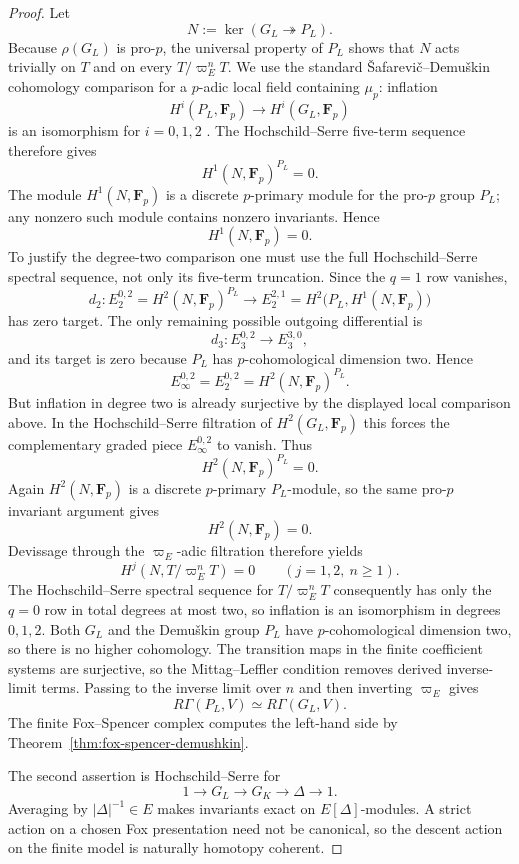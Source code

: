 \documentclass[11pt]{article}
\theoremstyle{definition}
\begin{document}
\begin{proof}
Let
\[
N:=\ker(G_L\twoheadrightarrow P_L).
\]
Because $\rho(G_L)$ is pro-$p$, the universal property of $P_L$ shows that $N$ acts trivially on $T$ and on every $T/\varpi_E^nT$.  We use the standard \v{S}afarevi\v{c}--Demu\v{s}kin cohomology comparison for a $p$-adic local field containing $\mu_p$: inflation
\[
H^i(P_L,\mathbf F_p)\longrightarrow H^i(G_L,\mathbf F_p)
\]
is an isomorphism for $i=0,1,2$ \cite{NSW}.  The Hochschild--Serre five-term sequence therefore gives
\[
H^1(N,\mathbf F_p)^{P_L}=0.
\]
The module $H^1(N,\mathbf F_p)$ is a discrete $p$-primary module for the pro-$p$ group $P_L$; any nonzero such module contains nonzero invariants.  Hence
\[
H^1(N,\mathbf F_p)=0.
\]
To justify the degree-two comparison one must use the full Hochschild--Serre spectral sequence, not only its five-term truncation.  Since the $q=1$ row vanishes,
\[
d_2:E_2^{0,2}=H^2(N,\mathbf F_p)^{P_L}
   \longrightarrow
   E_2^{2,1}=H^2\bigl(P_L,H^1(N,\mathbf F_p)\bigr)
\]
has zero target.  The only remaining possible outgoing differential is
\[
d_3:E_3^{0,2}\longrightarrow E_3^{3,0},
\]
and its target is zero because $P_L$ has $p$-cohomological dimension two.  Hence
\[
E_\infty^{0,2}=E_2^{0,2}=H^2(N,\mathbf F_p)^{P_L}.
\]
But inflation in degree two is already surjective by the displayed local comparison above.  In the Hochschild--Serre filtration of $H^2(G_L,\mathbf F_p)$ this forces the complementary graded piece $E_\infty^{0,2}$ to vanish.  Thus
\[
H^2(N,\mathbf F_p)^{P_L}=0.
\]
Again $H^2(N,\mathbf F_p)$ is a discrete $p$-primary $P_L$-module, so the same pro-$p$ invariant argument gives
\[
H^2(N,\mathbf F_p)=0.
\]
Devissage through the $\varpi_E$-adic filtration therefore yields
\[
H^j(N,T/\varpi_E^nT)=0
\qquad (j=1,2,\ n\ge1).
\]
The Hochschild--Serre spectral sequence for $T/\varpi_E^nT$ consequently has only the $q=0$ row in total degrees at most two, so inflation is an isomorphism in degrees $0,1,2$.  Both $G_L$ and the Demu\v{s}kin group $P_L$ have $p$-cohomological dimension two, so there is no higher cohomology.  The transition maps in the finite coefficient systems are surjective, so the Mittag--Leffler condition removes derived inverse-limit terms.  Passing to the inverse limit over $n$ and then inverting $\varpi_E$ gives
\[
R\Gamma(P_L,V)\simeq R\Gamma(G_L,V).
\]
The finite Fox--Spencer complex computes the left-hand side by Theorem~\ref{thm:fox-spencer-demushkin}.

The second assertion is Hochschild--Serre for
\[
1\longrightarrow G_L\longrightarrow G_K\longrightarrow\Delta\longrightarrow1.
\]
Averaging by $|\Delta|^{-1}\in E$ makes invariants exact on $E[\Delta]$-modules.  A strict action on a chosen Fox presentation need not be canonical, so the descent action on the finite model is naturally homotopy coherent.
\end{proof}
\end{document}
